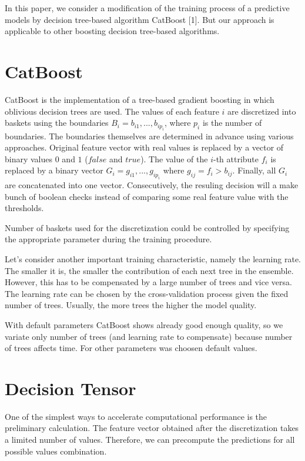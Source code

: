 \documentclass[a4paper]{jpconf}
\begin{document}
In this paper, we consider a modification of the training process of a predictive models by decision tree-based algorithm CatBoost [1]. But our approach is applicable to other boosting decision tree-based algorithms.

\section{CatBoost}

CatBoost is the implementation of a tree-based gradient boosting in which oblivious decision trees are used. The values of each feature $i$ are discretized into baskets using the boundaries $B_i={b_{i1},...,b_{ip_i}}$, where $p_i$ is the number of boundaries. The boundaries themselves are determined in advance using various approaches.
Original feature vector with real values is replaced by a vector of binary values $0$ and $1$ ($false$ and $true$). The value of the $i$-th attribute $f_i$ is replaced by a binary vector $G_i={g_{i1},...,g_{ip_i}}$ where $g_{ij} = f_i > b_{ij}$. Finally, all $G_i$ are concatenated into one vector. Consecutively, the resuling decision will a make bunch of boolean checks instead of comparing some real feature value with the thresholds.

Number of baskets used for the discretization could be controlled by specifying the appropriate parameter during the training procedure.

Let's consider another important training characteristic, namely the learning rate. The smaller it is, the smaller the contribution of each next tree in the ensemble. However, this has to be compensated by a large number of trees and vice versa. The learning rate can be chosen by the cross-validation process given the fixed number of trees. Usually, the more trees the higher the model quality.

With default parameters CatBoost shows already good enough quality, so we variate only number of trees (and learning rate to compensate) because number of trees affects time. For other parameters was choosen default values.

\section{Decision Tensor}
One of the simplest ways to accelerate computational performance is the preliminary calculation. The feature vector obtained after the discretization takes a limited number of values. Therefore, we can precompute the predictions for all possible values combination.
\end{document}

